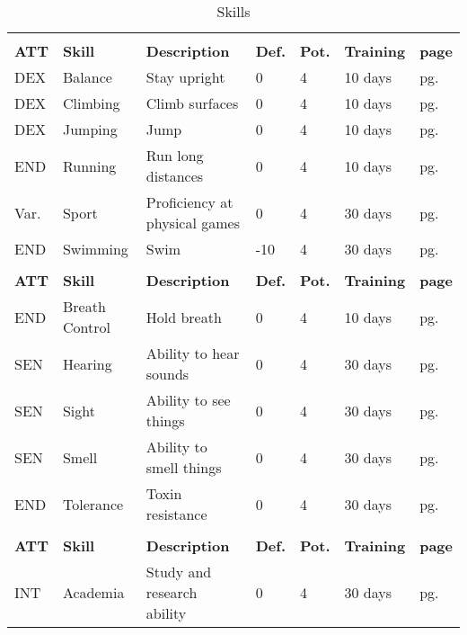 \begin{center}
    \unclassedrowcolors
    \begin{xltabular}{\textwidth}{l l X l l l l}
        \caption{Skills}\label{tab:skills} \endfoot
         \\*
        \textbf{ATT} & \textbf{Skill} & \textbf{Description} & \textbf{Def.} & \textbf{Pot.} & \textbf{Training} & \textbf{page} \\*
        DEX & Balance & Stay upright & 0 & 4 & 10 days & pg. \pageref{skill:balance} \\
        DEX & Climbing & Climb surfaces & 0 & 4 & 10 days & pg. \pageref{skill:climbing} \\
        DEX & Jumping & Jump & 0 & 4 & 10 days & pg. \pageref{skill:jumping} \\
        END & Running & Run long distances & 0 & 4 & 10 days & pg. \pageref{skill:running} \\
        Var. & Sport & Proficiency at physical games & 0 & 4 & 30 days & pg. \pageref{skill:sport} \\
        END & Swimming & Swim & -10 & 4 & 30 days & pg. \pageref{skill:swimming} \\
         \\*
        \textbf{ATT} & \textbf{Skill} & \textbf{Description} & \textbf{Def.} & \textbf{Pot.} & \textbf{Training} & \textbf{page} \\*
        END & Breath Control & Hold breath & 0 & 4 & 10 days & pg. \pageref{skill:hearing} \\
        SEN & Hearing & Ability to hear sounds & 0 & 4 & 30 days & pg. \pageref{skill:hearing} \\
        SEN & Sight & Ability to see things & 0 & 4 & 30 days & pg. \pageref{skill:sight} \\
        SEN & Smell & Ability to smell things & 0 & 4 & 30 days & pg. \pageref{skill:smell} \\
        END & Tolerance & Toxin resistance & 0 & 4 & 30 days & pg. \pageref{skill:tolerance} \\
         \\*
        \textbf{ATT} & \textbf{Skill} & \textbf{Description} & \textbf{Def.} & \textbf{Pot.} & \textbf{Training} & \textbf{page} \\*
        INT & Academia & Study and research ability & 0 & 4 & 30 days & pg. \pageref{skill:academia} \\

\end{xltabular}
\end{center}
